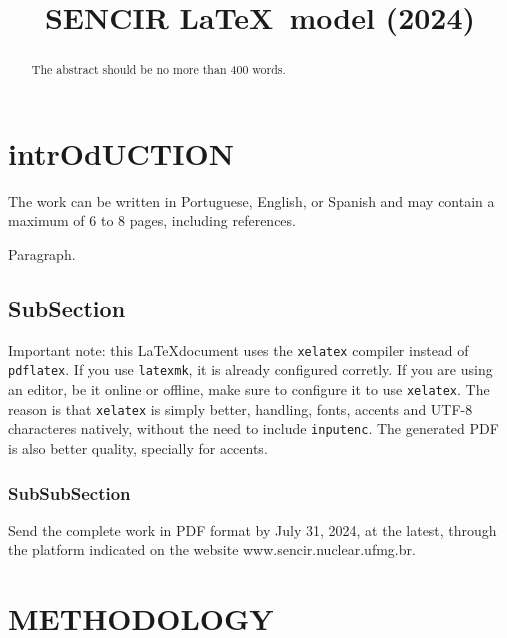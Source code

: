 \documentclass[english]{sencir}
\title{SENCIR \LaTeX ~model (2024)} %
\begin{document}
    \maketitle{}
    
    \begin{abstract} %
        The abstract should be no more than 400 words.
    \end{abstract}
    
    \section{intrOdUCTION} %
    
        The work can be written in Portuguese, English, or Spanish and may contain a %
        maximum of 6 to 8 pages, including references.

        Paragraph. %
        
        \subsection{SubSection}
            Important note: this \LaTeX document uses the \texttt{xelatex} compiler instead
            of \texttt{pdflatex}. If you use \texttt{latexmk}, it is already configured
            corretly. If you are using an editor, be it online or offline, make sure to
            configure it to use \texttt{xelatex}. The reason is that \texttt{xelatex} is
            simply better, handling, fonts, accents and UTF-8 characteres natively, without
            the need to include \texttt{inputenc}. The generated PDF is also better quality,
            specially for accents.

            \subsubsection{SubSubSection}
                Send the complete work in PDF format by July 31, 2024, at the latest, through
                the platform indicated on the website www.sencir.nuclear.ufmg.br.
    
    \section{METHODOLOGY}
    
\end{document}

